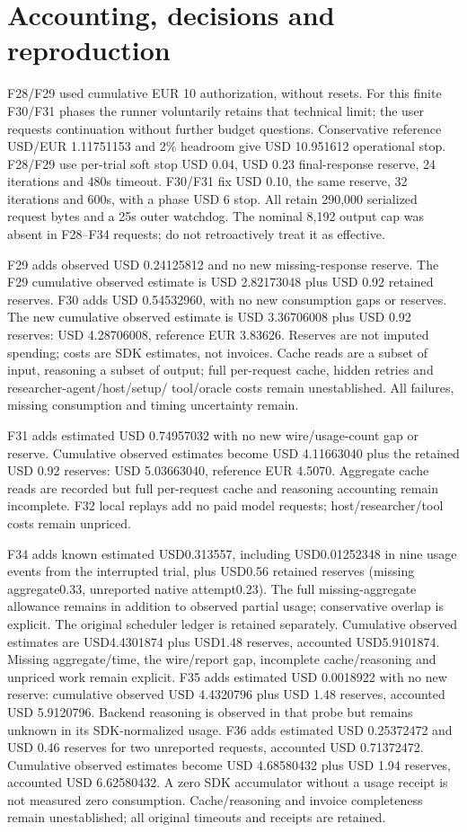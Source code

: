 \documentclass[11pt,a4paper]{article}
\begin{document}
\section{Accounting, decisions and reproduction}
F28/F29 used cumulative EUR 10 authorization, without resets. For this finite
F30/F31 phases the runner voluntarily retains that technical limit; the user requests
continuation without further budget questions. Conservative reference
USD/EUR 1.11751153 and 2\% headroom give USD 10.951612 operational stop.
F28/F29 use per-trial soft stop USD 0.04, USD 0.23 final-response reserve,
24 iterations and 480s timeout. F30/F31 fix USD 0.10, the same reserve,
32 iterations and 600s, with a phase USD 6 stop. All retain 290,000 serialized
request bytes and a 25s outer watchdog. The nominal 8,192 output cap
was absent in F28--F34 requests; do not retroactively treat it as effective.

F29 adds observed USD 0.24125812 and no new missing-response reserve.
The F29 cumulative observed estimate is USD 2.82173048 plus USD 0.92 retained
reserves. F30 adds USD 0.54532960, with no new consumption gaps or reserves.
The new cumulative observed estimate is USD 3.36706008 plus USD 0.92 reserves:
USD 4.28706008, reference EUR 3.83626. Reserves are not imputed spending; costs are
SDK estimates, not invoices. Cache reads are a subset of input, reasoning a subset
of output; full per-request cache, hidden retries and researcher-agent/host/setup/
tool/oracle costs remain
unestablished. All failures, missing consumption and timing uncertainty remain.

F31 adds estimated USD 0.74957032 with no new wire/usage-count gap or reserve.
Cumulative observed estimates become USD 4.11663040 plus the retained USD 0.92
reserves: USD 5.03663040, reference EUR 4.5070. Aggregate cache reads are recorded
but full per-request cache and reasoning accounting remain incomplete. F32 local
replays add no paid model requests; host/researcher/tool costs remain unpriced.

F34 adds known estimated USD0.313557, including USD0.01252348 in nine usage events
from the interrupted trial, plus USD0.56 retained reserves (missing aggregate0.33,
unreported native attempt0.23). The full missing-aggregate allowance remains in
addition to observed partial usage; conservative overlap is explicit. The original
scheduler ledger is retained separately. Cumulative observed estimates are
USD4.4301874 plus USD1.48 reserves, accounted USD5.9101874. Missing aggregate/time,
the wire/report gap, incomplete cache/reasoning and unpriced work remain explicit.
F35 adds estimated USD 0.0018922 with no new reserve: cumulative observed
USD 4.4320796 plus USD 1.48 reserves, accounted USD 5.9120796. Backend reasoning is
observed in that probe but remains unknown in its SDK-normalized usage.
F36 adds estimated USD 0.25372472 and USD 0.46 reserves for two unreported requests,
accounted USD 0.71372472. Cumulative observed estimates become USD 4.68580432 plus
USD 1.94 reserves, accounted USD 6.62580432. A zero SDK accumulator without a usage
receipt is not measured zero consumption. Cache/reasoning and invoice completeness
remain unestablished; all original timeouts and receipts are retained.
\end{document}
